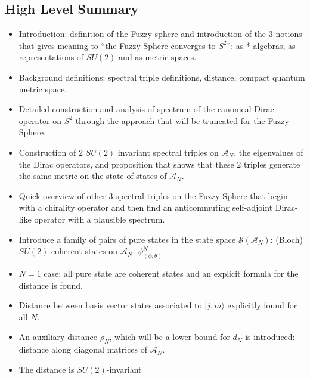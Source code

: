 \documentclass{article}
\begin{document}
\subsection{High Level Summary}

    \begin{itemize}

    \item Introduction: definition of the Fuzzy sphere and introduction of the $3$ notions that gives meaning to ``the Fuzzy Sphere converges to $S^2$'': as *-algebras, as representations of $SU(2)$ and as metric spaces.
    
    \item Background definitions: spectral triple definitions, distance, compact quantum metric space.
    
    \item Detailed construction and analysis of spectrum of the canonical Dirac operator on $S^2$ through the approach that will be truncated for the Fuzzy Sphere.
    
    \item Construction of $2$ $SU(2)$ invariant spectral triples on $\mathcal A_N$, the eigenvalues of the Dirac operators, and proposition that shows that these $2$ triples generate the same metric on the state of states of $\mathcal A_N$.
    
    \item Quick overview of other $3$ spectral triples on the Fuzzy Sphere that begin with a chirality operator and then find an anticommuting self-adjoint Dirac-like operator with a plausible spectrum.
    
    \item Introduce a family of pairs of pure states in the state space $\mathcal S(\mathcal A_N)$: (Bloch) $SU(2)$-coherent states on $\mathcal A_N$: $\psi^N_{(\phi, \theta)}$
    
    \item $N = 1$ case: all pure state are coherent states and an explicit formula for the distance is found.
    
    \item Distance between basis vector states associated to $|j, m\rangle$ explicitly found for all $N$.
    
    \item An auxiliary distance $\rho_N$, which will be a lower bound for $d_N$ is introduced: distance along diagonal matrices of $\mathcal A_N$.
    
    \item The distance is $SU(2)$-invariant
    

\end{itemize}
\end{document}
